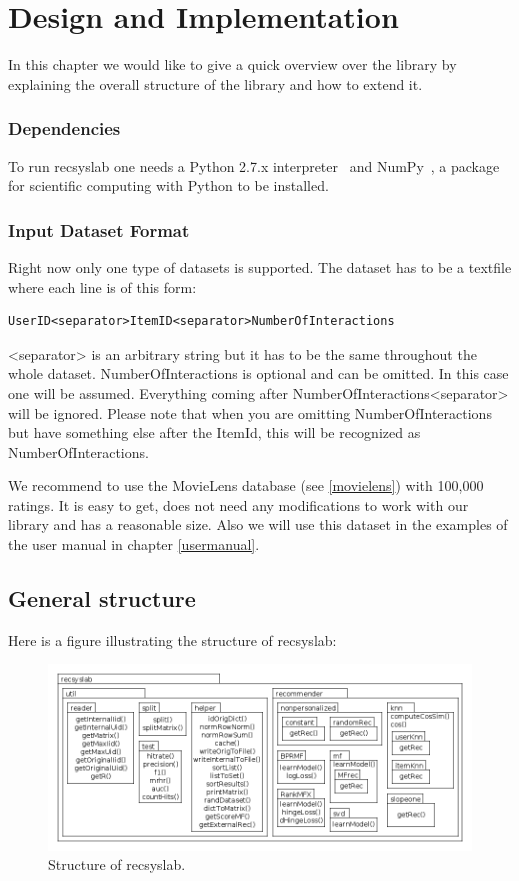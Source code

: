 
\chapter{Design and Implementation}
\label{design}
In this chapter we would like to give a quick overview over the library
by explaining the overall structure of the library and how to extend it.


\subsection*{Dependencies}
To run recsyslab one needs a Python 2.7.x interpreter~\cite{python} and NumPy~\cite{numpy},
a package for scientific computing with Python to be installed.

\subsection*{Input Dataset Format}
Right now only one type of datasets is supported. The dataset has to be
a textfile where each line is of this form:
\begin{lstlisting}
UserID<separator>ItemID<separator>NumberOfInteractions
\end{lstlisting}
<separator> is an arbitrary string but it has to be the same throughout the whole dataset.
NumberOfInteractions is optional and can be omitted. In this case one will be assumed.
Everything coming after NumberOfInteractions<separator> will be ignored.
Please note that when you are omitting NumberOfInteractions but have something else after
the ItemId, this will be recognized as NumberOfInteractions.

We recommend to use the MovieLens database (see \ref{movielens}) with 100,000 ratings.
It is easy to get, does not need any modifications to work with our library and has a
reasonable size. Also we will use this dataset in the examples of the user manual in 
chapter \ref{usermanual}.

%
\pagebreak
\section{General structure}
Here is a figure illustrating the structure of recsyslab:

\begin{figure}[H]
\includegraphics[scale=0.4]{packagediagram.png}
\caption{Structure of recsyslab.}
\end{figure}

